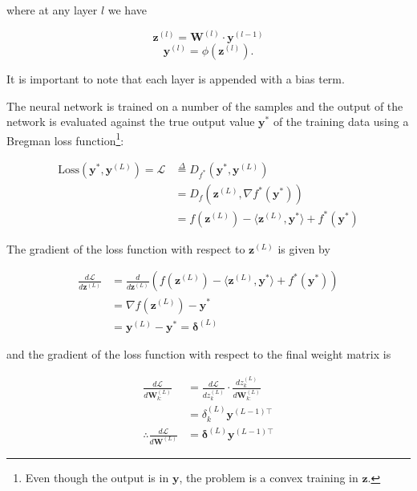 \documentclass[10pt]{article}
\theoremstyle{definition}
\begin{document}
\noindent
where at any layer $l$ we have

$$
\mathbf{z}^{(l)} = \mathbf{W}^{(l)} \cdot \mathbf{y}^{(l-1)}
$$
$$
\mathbf{y}^{(l)} = \phi(\mathbf{z}^{(l)}).
$$

\noindent
It is important to note that each layer is appended with a bias term.

The neural network is trained on a number of the samples and the output of the network is evaluated against the true output value $\mathbf{y}^*$ of the training data using a Bregman loss function\footnote{Even though the output is in $\mathbf{y}$, the problem is a convex training in $\mathbf{z}$.}:

\begin{equation*}
\begin{aligned}
\text{Loss}(\mathbf{y}^*, \mathbf{y}^{(L)}) = \mathcal{L} & \overset{\Delta}{=} D_{f^*}(\mathbf{y}^*, \mathbf{y}^{(L)}) \\
& = D_{f}(\mathbf{z}^{(L)}, \nabla f^*(\mathbf{y}^*)) \\
& = f(\mathbf{z}^{(L)}) - \langle \mathbf{z}^{(L)},\mathbf{y}^* \rangle + f^*(\mathbf{y}^*)
\end{aligned}
\end{equation*}

\noindent
The gradient of the loss function with respect to $\mathbf{z}^{(L)}$ is given by

\begin{equation*}
\begin{aligned}
\frac{d\mathcal{L}}{d\mathbf{z}^{(L)}} & = \frac{d}{d\mathbf{z}^{(L)}}\left(f(\mathbf{z}^{(L)}) - \langle \mathbf{z}^{(L)},\mathbf{y}^* \rangle + f^*(\mathbf{y}^*) \right) \\
& = \nabla f(\mathbf{z}^{(L)}) - \mathbf{y}^* \\
& = \mathbf{y}^{(L)} - \mathbf{y}^* = \pmb{\delta}^{(L)}
\end{aligned}
\end{equation*}

\noindent
and the gradient of the loss function with respect to the final weight matrix is

\begin{equation*}
\begin{aligned}
\frac{d\mathcal{L}}{d\mathbf{W}^{(L)}_{k:}} & = \frac{d\mathcal{L}}{dz^{(L)}_{k}} \cdot \frac{dz^{(L)}_{k}}{d\mathbf{W}^{(L)}_{k:}} \\
& = \delta^{(L)}_{k}\mathbf{y}^{(L-1)\top} \\
\therefore \frac{d\mathcal{L}}{d\mathbf{W}^{(L)}} & = \pmb{\delta}^{(L)}\mathbf{y}^{(L-1)\top}
\end{aligned}
\end{equation*}
\end{document}
